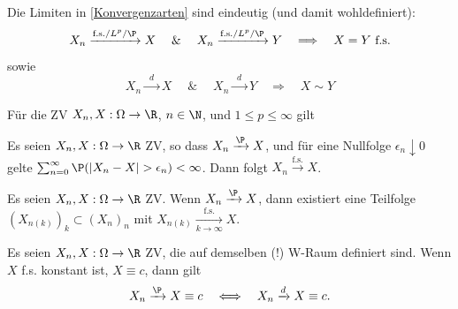 \documentclass[11pt, a4paper]{article}
\begin{document}
\begin{lemma}
    Die Limiten in \ref{Konvergenzarten} sind eindeutig (und damit wohldefiniert):
    $$X_n \xrightarrow{\text{f.s.}/L^p/\P} X \; \quad \& \quad \; X_n \xrightarrow{\text{f.s.}/L^p/\P} Y \quad \Longrightarrow \quad X = Y \text{ f.s.}$$ sowie
    $$X_n \xrightarrow{\; \  d \; \ } X \; \quad \& \quad\; X_n \xrightarrow{\; \  d \; \ } Y \quad \Longrightarrow \quad X \sim Y$$
\end{lemma}


\begin{lemma}[Konvergenzimplikationen] \Theorem
    Für die ZV $X_n, X: \Omega \to \R$, $n \in \N$, und $1 \le p \le \infty$ gilt

\begin{center}
\end{center}
\end{lemma}

\begin{lemma}
    Es seien $X_n, X: \Omega \to \R$ ZV, so dass $X_n \xrightarrow{\P} X$, und für eine Nullfolge $\epsilon_n \downarrow 0$ gelte $\sum_{n=0}^{\infty} \P(|X_n - X| > \epsilon_n) < \infty$. Dann folgt $X_n \xrightarrow{\text{f.s.}} X$.
\end{lemma}

\begin{corollary}
    Es seien $X_n, X: \Omega \to \R$ ZV. Wenn $X_n \xrightarrow{\P} X$, dann existiert eine Teilfolge $(X_{n(k)})_k \subset (X_n)_n$ mit $X_{n(k)} \xrightarrow[k \to \infty]{\text{f.s.}} X$.
\end{corollary}


\begin{lemma}
    Es seien $X_n, X: \Omega \to \R$ ZV, die auf demselben (!) W-Raum definiert sind. Wenn $X$ f.s. konstant ist, $X \equiv c$, dann gilt
    $$X_n \xrightarrow{\P} X \equiv c \quad \Longleftrightarrow \quad X_n \xrightarrow{d} X \equiv c.$$
\end{lemma}
\end{document}
